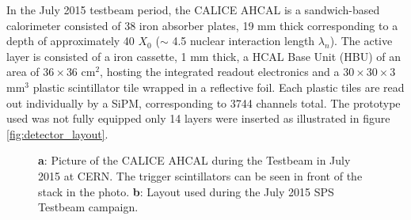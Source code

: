 \documentclass[twoside,a4paper,11pt]{article}
\begin{document}
In the July 2015 testbeam period, the CALICE AHCAL is a sandwich-based calorimeter consisted of 38 iron absorber plates, 19 mm thick corresponding to a depth of approximately 40 $X_0$ ($\sim$ 4.5 nuclear interaction length $\lambda_{n}$). The active layer is consisted of a iron cassette, 1 mm thick, a HCAL Base Unit (HBU) of an area of $36\times36$ cm$^2$, hosting the integrated readout electronics and a $30\times30\times3$ mm$^3$ plastic scintillator tile wrapped in a reflective foil. Each plastic tiles are read out individually by a SiPM, corresponding to 3744 channels total.
The prototype used was not fully equipped only 14 layers were inserted as illustrated in figure \ref{fig:detector_layout}. 
%
%
\begin{figure}[htbp]
	\hfill
	\caption[]{\textbf{a}: Picture of the CALICE AHCAL during the Testbeam in July 2015 at CERN. The trigger scintillators can be seen in front of the stack in the photo. \textbf{b}: Layout used during the July 2015 SPS Testbeam campaign.}
	\label{fig:full_detector_layout}
\end{figure}
\end{document}

